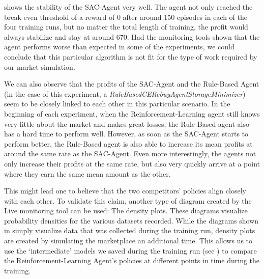  shows the stability of the SAC-Agent very well. The agent not only reached the break-even threshold of a reward of 0 after around 150 episodes in each of the four training runs, but no matter the total length of training, the profit would always stabilize and stay at around 670. Had the monitoring tools shown that the agent performs worse than expected in some of the experiments, we could conclude that this particular algorithm is not fit for the type of work required by our market simulation.

We can also observe that the profits of the SAC-Agent and the Rule-Based Agent (in the case of this experiment, a \emph{RuleBasedCERebuyAgentStorageMinimizer}) seem to be closely linked to each other in this particular scenario. In the beginning of each experiment, when the Reinforcement-Learning agent still knows very little about the market and makes great losses, the Rule-Based agent also has a hard time to perform well. However, as soon as the SAC-Agent starts to perform better, the Rule-Based agent is also able to increase its mean profits at around the same rate as the SAC-Agent. Even more interestingly, the agents not only increase their profits at the same rate, but also very quickly arrive at a point where they earn the same mean amount as the other.

This might lead one to believe that the two competitors' policies align closely with each other. To validate this claim, another type of diagram created by the Live monitoring tool can be used: The density plots. These diagrams visualize probability densities for the various datasets recorded. While the diagrams shown in  simply visualize data that was collected during the training run, density plots are created by simulating the marketplace an additional time. This allows us to use the `intermediate' models we saved during the training run (see ) to compare the Reinforcement-Learning Agent's policies at different points in time during the training.

